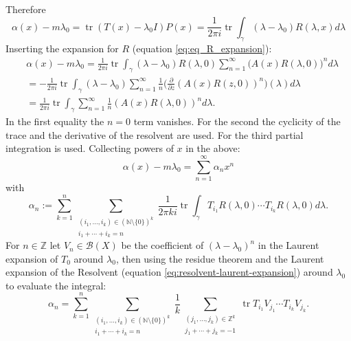 \documentclass[11pt, a4paper]{article} %
\numberwithin{equation}{subsection} %
\theoremstyle{definition} %
\theoremstyle{plain} %
\DeclareMathOperator{\tr}{tr}
\begin{document}
Therefore
\begin{equation}
	\alpha (x) -  m \lambda_0 = \tr (T(x) - \lambda_0 I ) P(x)
	= \frac{1}{2\pi i} \tr \int_\gamma (\lambda - \lambda_0 ) R(\lambda, x) d\lambda
\end{equation}
Inserting the expansion for $R$ (equation \ref{eq:eq_R_expansion}):
\begin{equation}
	\begin{split}
		&\alpha (x) -  m \lambda_0
		= \frac{1}{2\pi i} \tr \int_\gamma (\lambda - \lambda_0 )  R(\lambda,0)  \sum_{n=1}^\infty  (A(x) R(\lambda,0) \big)^n d\lambda \\
		&= -\frac{1}{2\pi i} \tr \int_\gamma (\lambda - \lambda_0) \sum_{n=1}^\infty \frac{1}{n}
		\bigg(\frac{\partial }{ \partial z}  (A(x) R(z,0))^n \bigg) (\lambda) d \lambda  \\
		&= \frac{1}{2\pi i} \tr \int_\gamma  \sum_{n=1}^\infty \frac{1}{n}
		(A(x) R(\lambda,0))^n  d \lambda.
	\end{split}
\end{equation}
In the first equality the $n=0$ term vanishes.
For the second the cyclicity of the trace and the derivative of the resolvent are used.
For the third partial integration is used.
Collecting powers of $x$ in the above:
\begin{equation}
	\alpha (x) - m \lambda_0 = \sum_{n=1}^\infty \alpha_n x^n
\end{equation}
with
\begin{equation}
	\alpha_n := \sum_{k=1}^n  \sum_{ \substack{(i_1, \dots, i_k) \in (\mathbb{N} \setminus \{0\})^k \\ i_1 + \cdots + i_k = n}}
	\frac{1}{2 \pi k i} \tr \int_\gamma T_{i_1} R(\lambda, 0)  \cdots  T_{i_k} R(\lambda, 0) d \lambda .
\end{equation}
For $n \in \mathbb{Z}$ let $V_n \in \mathscr{B}(X)$ be the coefficient of $(\lambda-\lambda_0)^{n}$ in the Laurent expansion of $T_0$
around $\lambda_0$, then
using the residue theorem and the Laurent expansion of the Resolvent (equation \ref{eq:resolvent-laurent-expansion}) around $\lambda_0$ to evaluate the integral:
\begin{equation}
	\alpha_n =\sum_{k=1}^n
	\sum_{ \substack{(i_1, \dots, i_k) \in (\mathbb{N} \setminus \{0\})^k \\ i_1 + \cdots + i_k = n}}
	\frac{1}{k} \sum_{\substack{(j_1, \dots, j_k) \in \mathbb{Z}^k\\ j_1 + \cdots + j_k = -1 }}
	\tr T_{i_1} V_{j_1} \cdots T_{i_k} V_{j_k}.
\end{equation}
\end{document}
